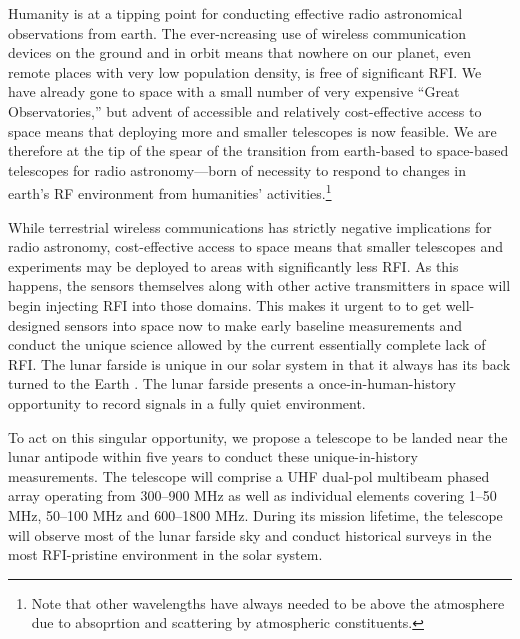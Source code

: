 Humanity is at a tipping point for conducting effective radio astronomical observations from earth. The ever-ncreasing use of wireless communication devices on the ground and in orbit means that nowhere on our planet, even  remote places with very low population density, is free of significant RFI. We have already gone to space with a small number of very expensive “Great Observatories,” but advent of accessible and relatively cost-effective access to space means that deploying more and smaller telescopes is now feasible. We are therefore at the tip of the spear of the transition from earth-based to space-based telescopes for radio astronomy---born of necessity to respond to changes in earth’s RF environment from humanities' activities.\footnote{Note that other wavelengths have always needed to be above the atmosphere due to absoprtion and scattering by atmospheric constituents.}  

While terrestrial wireless communications has strictly negative implications for radio astronomy, cost-effective access to space means that smaller telescopes and experiments may be deployed to areas with significantly less RFI. As this happens, the sensors themselves along with other active transmitters in space will begin injecting RFI into those domains. This makes it urgent to to get well-designed sensors into space now to make early baseline measurements and conduct the unique science allowed by the current essentially complete lack of RFI. The lunar farside is unique in our solar system in that it always has its back turned to the Earth \cite{heidmann2002,MACCONE2019233,michaud2020lunar}. The lunar farside presents a once-in-human-history opportunity to record signals in a fully quiet environment. 

To act on this singular opportunity, we propose a telescope to be landed near the lunar antipode within five years to conduct these unique-in-history measurements.  The telescope will comprise a UHF dual-pol multibeam phased array operating from 300--900 MHz as well as individual elements covering 1--50 MHz, 50--100 MHz and 600--1800 MHz.  During its mission lifetime, the telescope will observe most of the lunar farside sky and conduct historical surveys in the most RFI-pristine environment in the solar system. 